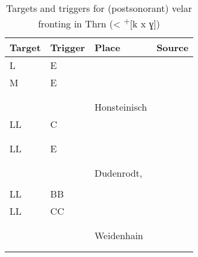 \begin{table}
\caption{Targets and triggers for (postsonorant) velar fronting in Thrn (< \textsuperscript{+}[k x ɣ])\label{tab:12.10}}
\begin{tabularx}{\textwidth}{llQQ}
\lsptoprule
Target & Trigger & Place & Source\\\midrule
L & E &   & \citet{Flex1893}\\
M & E &    & \citet{Schultze1874}   \\
  &   &           & \citet{Liesenberg1890} \\
  &   &       & \citet{Hentrich1905}   \\
  &   &   Honsteinisch   & \citet{Rudolph1924}\\
LL & C &            & \citet{KürstenBremer1910}        \\
   &   &    & \citet{Kürsten1910,Kürsten1911}  \\
   &   &              &  \citet{Hentrich1920}\\
LL & E &     & \citet{Frank1898}      \\
   &   &         &\citet{Schirmer1932}    \\
   &   &            &\citet{Spangenberg1962} \\
   &   & Dudenrodt,     &\citet{Guentherodt1982} \\
   &   &             &\citet{Weldner1991}\\
LL & BB &   & \citet{Spangenberg1989}\\
LL & CC &           & \citet{Trebs1899}  \\
   &    &           & \citet{Daube1906}  \\
   &    &     & \citet{Rasch1912}  \\
   &    & Weidenhain        & \citet{Krug1969}   \\
   &    &        & \citet{Harnisch1987}\\
\lspbottomrule
\end{tabularx}
\end{table}

